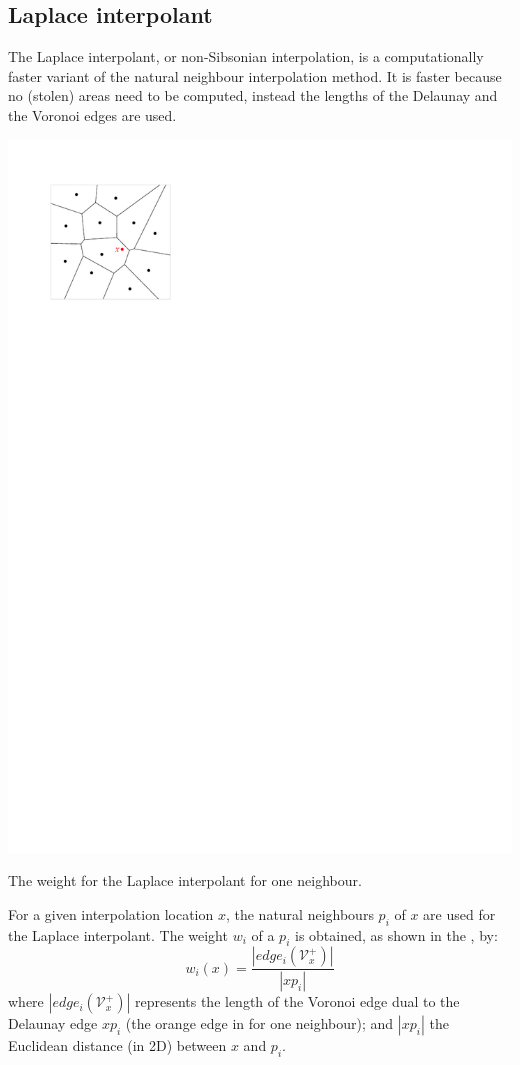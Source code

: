 \subsection{Laplace interpolant}%
\label{sec:laplace}

The Laplace interpolant, or non-Sibsonian interpolation, is a computationally faster variant of the natural neighbour interpolation method.
It is faster because no (stolen) areas need to be computed, instead the lengths of the Delaunay and the Voronoi edges are used.

%
\begin{marginfigure}
  \centering
  \includegraphics[width=\textwidth,page=3]{figs/laplace.pdf}%
  \caption{The weight for the Laplace interpolant for one neighbour.}%
\end{marginfigure}
For a given interpolation location $x$, the natural neighbours $p_i$ of $x$ are used for the Laplace interpolant.
The weight $w_i$ of a $p_i$ is obtained, as shown in the , by:
\begin{equation}
  w_{i}(x) = \frac{|edge_i(\mathcal{V}^{+}_{x})|}{|xp_i|}
  \label{eq:laplace}
\end{equation}
where $|edge_i(\mathcal{V}^{+}_{x})|$ represents the length of the Voronoi edge dual to the Delaunay edge $xp_i$ (the orange edge in  for one neighbour); 
and $|xp_i|$ the Euclidean distance (in 2D) between $x$ and $p_i$.

